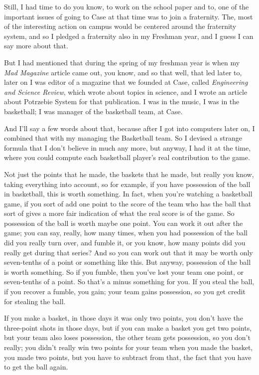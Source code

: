 \documentclass[]{article}
\begin{document}
Still, I had time to do you know, to work on the school paper and to,
one of the important issues of going to Case at that time was to join a
fraternity. The, most of the interesting action on campus would be
centered around the fraternity system, and so I pledged a fraternity
also in my Freshman year, and I guess I can say more about that.

But I had mentioned that during the spring of my freshman year is when
my \emph{Mad Magazine} article came out, you know, and so that well,
that led later to, later on I was editor of a magazine that we founded
at Case, called \emph{Engineering and Science Review}, which wrote about
topics in science, and I wrote an article about Potrzebie System for
that publication. I was in the music, I was in the basketball; I was
manager of the basketball team, at Case.

And I'll say a few words about that, because after I got into computers
later on, I combined that with my managing the Basketball team. So I
devised a strange formula that I don't believe in much any more, but
anyway, I had it at the time, where you could compute each basketball
player's real contribution to the game.

Not just the points that he made, the baskets that he made, but really
you know, taking everything into account, so for example, if you have
possession of the ball in basketball, this is worth something. In fact,
when you're watching a basketball game, if you sort of add one point to
the score of the team who has the ball that sort of gives a more fair
indication of what the real score is of the game. So possession of the
ball is worth maybe one point. You can work it out after the game; you
can say, really, how many times, when you had possession of the ball did
you really turn over, and fumble it, or you know, how many points did
you really get during that series? And so you can work out that it may
be worth only seven-tenths of a point or something like this. But
anyway, possession of the ball is worth something. So if you fumble,
then you've lost your team one point, or seven-tenths of a point. So
that's a minus something for you. If you steal the ball, if you recover
a fumble, you gain; your team gains possession, so you get credit for
stealing the ball.

If you make a basket, in those days it was only two points, you don't
have the three-point shots in those days, but if you can make a basket
you get two points, but your team also loses possession, the other team
gets possession, so you don't really; you didn't really win two points
for your team when you made the basket, you made two points, but you
have to subtract from that, the fact that you have to get the ball
again.
\end{document}
